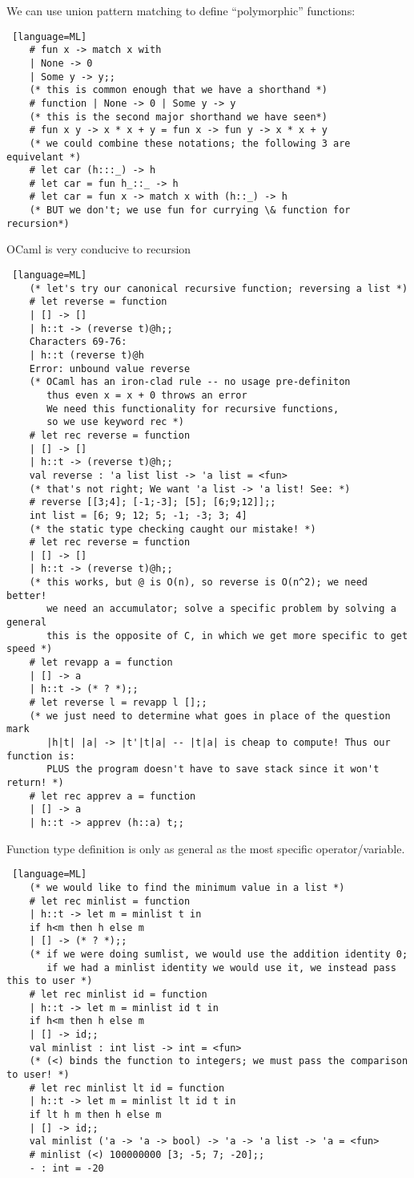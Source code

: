 \documentclass[../../lecture_notes.tex]{subfiles}
\begin{document}
\noindent We can use union pattern matching to define “polymorphic” functions:
\begin{lstlisting} [language=ML]
	# fun x -> match x with
	| None -> 0
	| Some y -> y;;
	(* this is common enough that we have a shorthand *)
	# function | None -> 0 | Some y -> y
	(* this is the second major shorthand we have seen*)
	# fun x y -> x * x + y = fun x -> fun y -> x * x + y
	(* we could combine these notations; the following 3 are equivelant *)
	# let car (h:::_) -> h
	# let car = fun h_::_ -> h
	# let car = fun x -> match x with (h::_) -> h
	(* BUT we don't; we use fun for currying \& function for recursion*)
\end{lstlisting} \medskip

\noindent OCaml is very conducive to recursion
\begin{lstlisting} [language=ML]
	(* let's try our canonical recursive function; reversing a list *)
	# let reverse = function 
	| [] -> []
	| h::t -> (reverse t)@h;;
	Characters 69-76:
	| h::t (reverse t)@h
	Error: unbound value reverse
	(* OCaml has an iron-clad rule -- no usage pre-definiton
	   thus even x = x + 0 throws an error 
	   We need this functionality for recursive functions, 
	   so we use keyword rec *)
	# let rec reverse = function
	| [] -> []
	| h::t -> (reverse t)@h;;
	val reverse : 'a list list -> 'a list = <fun>
	(* that's not right; We want 'a list -> 'a list! See: *)
	# reverse [[3;4]; [-1;-3]; [5]; [6;9;12]];;
	int list = [6; 9; 12; 5; -1; -3; 3; 4]
	(* the static type checking caught our mistake! *)
	# let rec reverse = function
	| [] -> []
	| h::t -> (reverse t)@h;;
	(* this works, but @ is O(n), so reverse is O(n^2); we need better! 
	   we need an accumulator; solve a specific problem by solving a general
	   this is the opposite of C, in which we get more specific to get speed *)
	# let revapp a = function
	| [] -> a
	| h::t -> (* ? *);;
	# let reverse l = revapp l [];;
	(* we just need to determine what goes in place of the question mark
	   |h|t| |a| -> |t'|t|a| -- |t|a| is cheap to compute! Thus our function is: 
	   PLUS the program doesn't have to save stack since it won't return! *)
	# let rec apprev a = function
	| [] -> a
	| h::t -> apprev (h::a) t;;
\end{lstlisting} \medskip

\noindent Function type definition is only as general as the most specific operator/variable.
\begin{lstlisting} [language=ML]
	(* we would like to find the minimum value in a list *)
	# let rec minlist = function 
	| h::t -> let m = minlist t in
	if h<m then h else m
	| [] -> (* ? *);;
	(* if we were doing sumlist, we would use the addition identity 0;
	   if we had a minlist identity we would use it, we instead pass this to user *)
	# let rec minlist id = function
	| h::t -> let m = minlist id t in
	if h<m then h else m
	| [] -> id;;
	val minlist : int list -> int = <fun>
	(* (<) binds the function to integers; we must pass the comparison to user! *)
	# let rec minlist lt id = function
	| h::t -> let m = minlist lt id t in
	if lt h m then h else m
	| [] -> id;;
	val minlist ('a -> 'a -> bool) -> 'a -> 'a list -> 'a = <fun>
	# minlist (<) 100000000 [3; -5; 7; -20];;
	- : int = -20
\end{lstlisting}
\end{document}
